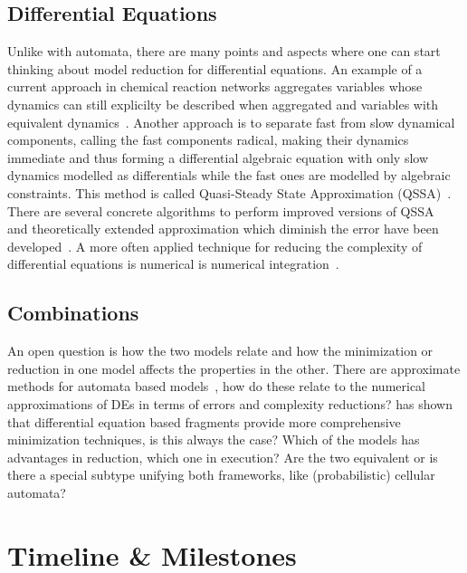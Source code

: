 \documentclass[11pt, rgb]{scrartcl}
\begin{document}
\subsection{Differential Equations}
Unlike with automata, there are many points and aspects where one can start thinking about model reduction for differential equations. 
An example of a current approach in chemical reaction networks aggregates variables whose dynamics can still explicilty be described when aggregated and variables with equivalent dynamics~\autocite{Cardelli2017MaximalAO}.
Another approach is to separate fast from slow dynamical components, calling the fast components radical, making their dynamics immediate and thus forming a differential algebraic equation with only slow dynamics modelled as differentials while the fast ones are modelled by algebraic constraints. 
This method is called Quasi-Steady State Approximation (QSSA)~\autocite{briggs1925note}.
There are several concrete algorithms to perform improved versions of QSSA~\autocite{boulier2009towards} and theoretically extended approximation which diminish the error have been developed~\autocite{deuflhard1996dynamic}.
A more often applied technique for reducing the complexity of differential equations is numerical is numerical integration~\autocite{curtiss1952integration, kutta1901beitrag, orszag1969numerical}. 


\subsection{Combinations}
An open question is how the two models relate and how the minimization or reduction in one model affects the properties in the other. There are approximate methods for automata based models~\autocite{bobbio1986aggregation, geiger}, how do these relate to the numerical approximations of DEs in terms of errors and complexity reductions? \autocite{mc_agg_crn} has shown that differential equation based fragments provide more comprehensive minimization techniques, is this always the case? Which of the models has advantages in reduction, which one in execution? Are the two equivalent or is there a special subtype unifying both frameworks, like (probabilistic) cellular automata\autocite{von1966theory, olariu2005cellular, grinstein1985statistical}?

\printbibliography

\appendix

\section{Timeline \& Milestones}
\end{document}
